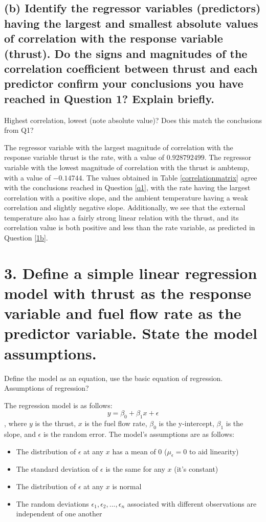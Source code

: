 \documentclass[letterpaper]{article}
\begin{document}
\subsection{(b)	Identify the regressor variables (predictors) having the largest and smallest absolute values of correlation with the response variable (thrust). Do the signs and magnitudes of the correlation coefficient between thrust and each predictor confirm your conclusions you have reached in Question 1? Explain briefly.}
Highest correlation, lowest (note absolute value)? Does this
match the conclusions from Q1?

The regressor variable with the largest magnitude of correlation with the response
variable thrust is the rate, with a value of $0.928792499$.
The regressor variable with the lowest magnitude of correlation with the thrust
is ambtemp, with a value of $-0.14744$.
The values obtained in Table \ref{correlationmatrix} agree
with the conclusions reached in Question \ref{q1}, with
the rate having the largest correlation with a positive slope, and the
ambient temperature having a weak correlation and slightly negative slope.
Additionally, we see that the external temperature also has a fairly strong
linear relation with the thrust, and its correlation value is both positive and less than
the rate variable, as predicted in Question \ref{1b}.

\section{3.	Define a simple linear regression model with thrust as the response variable and fuel flow rate as the predictor variable.  State the model assumptions.}
Define the model as an equation, use the basic equation of
regression. Assumptions of regression?

The regression model is as follows:
\begin{equation}
 y = \beta_0 + \beta_1 x + \epsilon
 \label{model}
\end{equation}
, where $y$ is the thrust, $x$ is the fuel flow rate, $\beta_0$ is the y-intercept, $\beta_1$
is the slope, and $\epsilon$ is the random error.
The model's assumptions are as follows:
\begin{itemize}
 \item The distribution of $\epsilon$ at any $x$ has a mean of 0 ($\mu_\epsilon=0$ to aid linearity)
 \item The standard deviation of $\epsilon$ is the same for any $x$ (it's constant)
 \item The distribution of $\epsilon$ at any $x$ is normal
 \item The random deviations $\epsilon_1, \epsilon_2, ..., \epsilon_n$ associated with different observations are independent of one another
\end{itemize}
\end{document}
